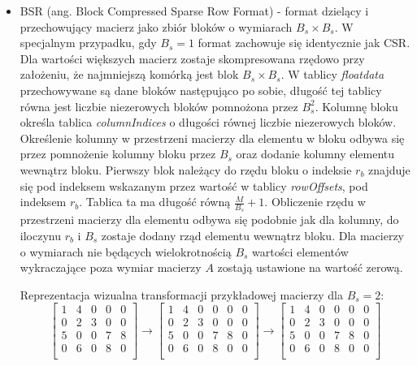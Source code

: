 \begin{itemize}
    \item BSR (ang. Block Compressed Sparse Row Format) - format dzielący i przechowujący macierz jako zbiór bloków o wymiarach $B_s \times B_s$.
    W specjalnym przypadku, gdy $B_s = 1$ format zachowuje się identycznie jak CSR.
    Dla wartości większych macierz zostaje skompresowana rzędowo przy założeniu, że najmniejszą komórką jest blok $B_s \times B_s$.
    W tablicy \textit{floatdata} przechowywane są dane bloków następująco po sobie, długość tej tablicy równa jest liczbie niezerowych bloków pomnożona przez $B_s ^ 2$.
    Kolumnę bloku określa tablica \textit{columnIndices} o długości równej liczbie niezerowych bloków.
    Określenie kolumny w przestrzeni macierzy dla elementu w bloku odbywa się przez pomnożenie kolumny bloku przez $B_s$ oraz dodanie kolumny elementu wewnątrz bloku.
    Pierwszy blok należący do rzędu bloku o indeksie $r_b$ znajduje się pod indeksem wskazanym przez wartość w tablicy \textit{rowOffsets}, pod indeksem $r_b$.
    Tablica ta ma długość równą $\frac{M}{B_s} + 1$.
    Obliczenie rzędu w przestrzeni macierzy dla elementu odbywa się podobnie jak dla kolumny, do iloczynu $r_b$ i $B_s$ zostaje dodany rząd elementu wewnątrz bloku. 
    Dla macierzy o wymiarach nie będących wielokrotnością $B_s$ wartości elementów wykraczające poza wymiar macierzy $A$ zostają ustawione na wartość zerową.

    Reprezentacja wizualna transformacji przykładowej macierzy dla $B_s = 2$:
    \[
\left[
\begin{array}{cccccc}
    1 & 4 & 0 & 0 & 0\\ 
    0 & 2 & 3 & 0 & 0\\ 
    5 & 0 & 0 & 7 & 8\\ 
    0 & 6 & 0 & 8 & 0\\ 
\end{array}
\right]
\rightarrow
\left[
\begin{array}{cccccc}
    1 & 4 & 0 & 0 & 0 & 0 \\ 
    0 & 2 & 3 & 0 & 0 & 0 \\ 
    5 & 0 & 0 & 7 & 8 & 0 \\ 
    0 & 6 & 0 & 8 & 0 & 0 \\ 
\end{array}
\right]
\rightarrow
\left[
\begin{array}{cc|cc|cc}
    1 & 4 & 0 & 0 & 0 & 0 \\ 
    0 & 2 & 3 & 0 & 0 & 0 \\ 
    \hline
    5 & 0 & 0 & 7 & 8 & 0 \\ 
    0 & 6 & 0 & 8 & 0 & 0 \\ 
\end{array}
\right]
\]


\end{itemize}
